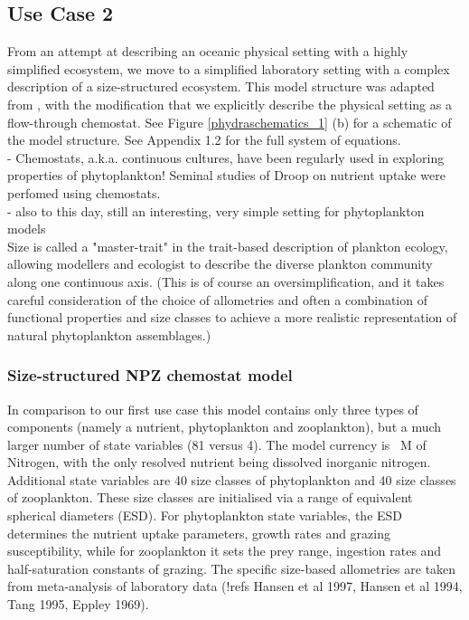\documentclass[template.tex]{subfiles}
\begin{document}
\subsection{Use Case 2}

From an attempt at describing an oceanic physical setting with a highly simplified ecosystem, we move to a simplified laboratory setting with a complex description of a size-structured ecosystem. This model structure was adapted from \cite{Banas2011b}, with the modification that we explicitly describe the physical setting as a flow-through chemostat. See Figure \ref{phydraschematics_1} (b) for a schematic of the model structure. See Appendix 1.2 for the full system of equations. \\

- Chemostats, a.k.a. continuous cultures, have been regularly used in exploring properties of phytoplankton! Seminal studies of Droop on nutrient uptake were perfomed using chemostats. \citep{Droop1968VitaminLutheri} \\
- also to this day, still an interesting, very simple setting for phytoplankton models\\

Size is called a "master-trait" in the trait-based description of plankton ecology, allowing modellers and ecologist to describe the diverse plankton community along one continuous axis. (This is of course an oversimplification, and it takes careful consideration of the choice of allometries and often a combination of functional properties and size classes to achieve a more realistic representation of natural phytoplankton assemblages.)

\subsubsection{Size-structured NPZ chemostat model}

In comparison to our first use case this model contains only three types of components (namely a nutrient, phytoplankton and zooplankton), but a much larger number of state variables (81 versus 4). The model currency is \unit{\mu M} of Nitrogen, with the only resolved nutrient being dissolved inorganic nitrogen. Additional state variables are 40 size classes of phytoplankton and 40 size classes of zooplankton. These size classes are initialised via a range of equivalent spherical diameters (ESD). For phytoplankton state variables, the ESD determines the nutrient uptake parameters, growth rates and grazing susceptibility, while for zooplankton it sets the prey range, ingestion rates and half-saturation constants of grazing. The specific size-based allometries are taken from meta-analysis of laboratory data (!refs Hansen et al 1997, Hansen et al 1994, Tang 1995, Eppley 1969). 
\end{document}
